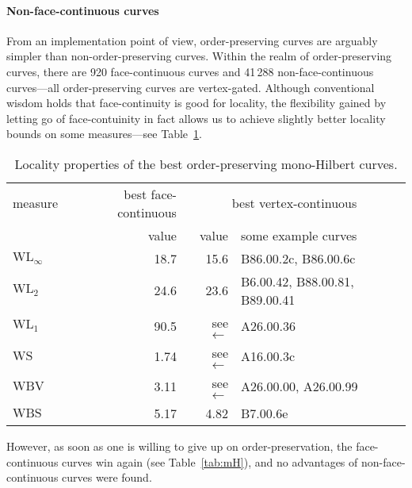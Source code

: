 \documentclass[11pt,a4paper]{article}
\def\WLMax{\ensuremath{\mathrm{WL}_\infty}\xspace}
\def\WLEuc{\ensuremath{\mathrm{WL}_2}\xspace}
\def\WLMan{\ensuremath{\mathrm{WL}_1}\xspace}
\def\WS{\ensuremath{\mathrm{WS}}\xspace}
\def\WBV{\ensuremath{\mathrm{WBV}}\xspace}
\def\WBS{\ensuremath{\mathrm{WBS}}\xspace}
\begin{document}
\paragraph{Non-face-continuous curves}
From an implementation point of view, order-preserving curves are arguably simpler than non-order-preserving curves. Within the realm of order-preserving curves, there are 920 face-continuous curves and 41\,288 non-face-continuous curves---all order-preserving curves are vertex-gated. Although conventional wisdom holds that face-continuity is good for locality, the flexibility gained by letting go of face-contuinity in fact allows us to achieve slightly better locality bounds on some measures---see Table~\ref{tab:OmH}.

\begin{table}
\centering
\begin{tabular}{|l|r|rl|}
\hline
measure & best face-continuous & \multicolumn{2}{c|}{best vertex-continuous} \\
        & value                & value & some example curves \\
\hline
\WLMax  &                18.7 &       15.6 & B86.00.2c, B86.00.6c \\
\WLEuc  &                24.6 &       23.6 & B6.00.42, B88.00.81, B89.00.41 \\
\WLMan  &                90.5 & see $\leftarrow$ & A26.00.36 \\
\WS     &                1.74 & see $\leftarrow$ & A16.00.3c \\
\WBV    &                3.11 & see $\leftarrow$ & A26.00.00, A26.00.99 \\
\WBS    &                5.17 &       4.82 & B7.00.6e \\
\hline
\end{tabular}
\caption{Locality properties of the best order-preserving mono-Hilbert curves.}
\label{tab:OmH}
\end{table}

However, as soon as one is willing to give up on order-preservation, the face-continuous curves win again (see Table~\ref{tab:mH}), and no advantages of non-face-continuous curves were found.
\end{document}
